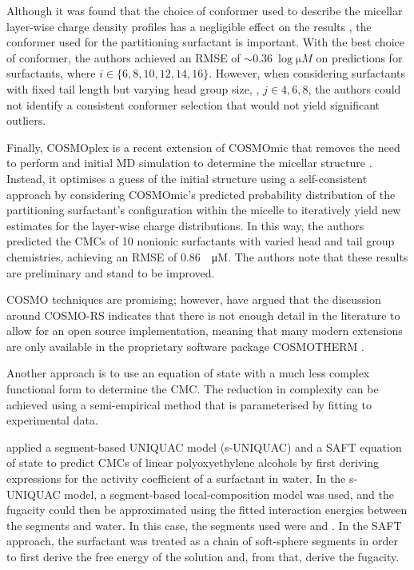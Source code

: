 Although it was found that the choice of conformer used to describe the micellar
layer-wise charge density profiles has a negligible effect on the results
\cite{jakobtorweihenCombinationCOSMOmicMolecular2013}, the conformer used for
the partitioning surfactant is important. With the best choice of conformer, the
authors achieved an RMSE of $\sim \SI{0.36}{\log \micro M}$ on predictions for
 surfactants, where $i \in \{6, 8, 10, 12, 14, 16\}$. However, when
considering surfactants with fixed tail length but varying head group size,
, $j \in {4, 6, 8}$, the authors could not identify a consistent
conformer selection that would not yield significant outliers.

Finally, COSMOplex is a recent extension of COSMOmic that removes the need to
perform and initial MD simulation to determine the micellar structure
\cite{klamtCOSMOplexSelfconsistentSimulation2019}. Instead, it optimises a guess
of the initial structure using a self-consistent approach by considering
COSMOmic's predicted probability distribution of the partitioning surfactant's
configuration within the micelle to iteratively yield new estimates for the
layer-wise charge distributions. In this way, the authors predicted the CMCs of
10 nonionic surfactants with varied head and tail group chemistries, achieving
an RMSE of \SI{0.86}{\log \micro M}. The authors note that these results are
preliminary and stand to be improved.

COSMO techniques are promising; however,
\citet{herbertDielectricContinuumMethods2021} have argued that the discussion
around COSMO-RS indicates that there is not enough detail in the literature to
allow for an open source implementation, meaning that many modern extensions are
only available in the proprietary software package \textsc{COSMOTHERM}
\cite{eckertFastSolventScreening2002}.

Another approach is to use an equation of state with a much less complex
functional form to determine the CMC. The reduction in complexity can be
achieved using a semi-empirical method that is parameterised by fitting to
experimental data.

\citet{liStudiesUNIQUACSAFT1998} applied a segment-based UNIQUAC model
(s-UNIQUAC) and a SAFT equation of state to predict CMCs of linear
polyoxyethylene alcohols by first deriving expressions for the activity
coefficient of a surfactant in water. In the s-UNIQUAC model, a segment-based
local-composition model was used, and the fugacity could then be approximated
using the fitted interaction energies between the segments and water. In this
case, the segments used were  and . In the SAFT approach, the
surfactant was treated as a chain of soft-sphere segments in order to first
derive the free energy of the solution and, from that, derive the fugacity.

